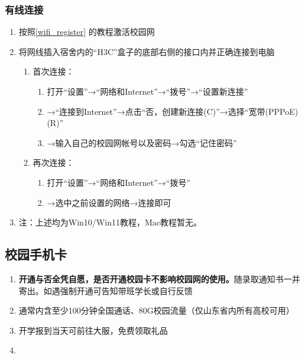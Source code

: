 \subsubsection[有线连接]{有线连接}
\begin{enumerate}
    \item 按照\uline{\ref{wifi_register}} 的教程激活校园网
    \item 将网线插入宿舍内的“H3C”盒子的底部右侧的接口内并正确连接到电脑\footnotemark
          \begin{enumerate}
              \item 首次连接：
                    \begin{enumerate}
                        \item 打开“设置”→“网络和Internet”→“拨号”→“设置新连接”
                        \item →“连接到Internet”→点击“否，创建新连接(C)”→选择“宽带(PPPoE)(R)”
                        \item →输入自己的校园网帐号以及密码→勾选“记住密码”
                    \end{enumerate}
              \item 再次连接：
                    \begin{enumerate}
                        \item 打开“设置”→“网络和Internet”→“拨号”
                        \item →选中之前设置的网络→连接即可
                    \end{enumerate}
          \end{enumerate}
    \item  注：上述均为Win10/Win11教程，Mac教程暂无。
\end{enumerate}

\subsection[校园手机卡]{校园手机卡}
\begin{enumerate}
    \item \textbf{开通与否全凭自愿，是否开通校园卡不影响校园网的使用。}随录取通知书一并寄出。如遇强制开通可告知带班学长或自行反馈
    \item 通常内含至少100分钟全国通话、80G校园流量（仅山东省内所有高校可用）\footnotemark
    \item 开学报到当天可前往大服，免费领取礼品
    \item \textbf{}
\end{enumerate}

